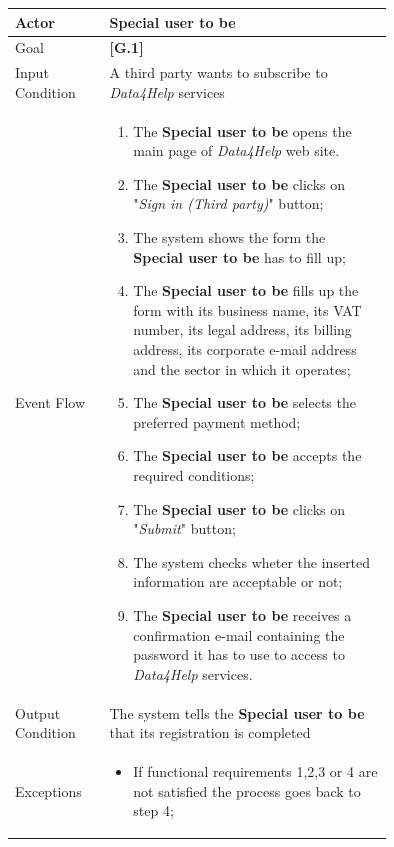\begin{center}
\begin{table}
\begin{tabular}{ | l | p{0.75\linewidth} | }
  \hline
    Actor & \textbf{Special user to be} \\ \hline
    Goal & \textbf{[G.1]} \\ \hline
    Input Condition & A third party wants to subscribe to \textit{Data4Help} services \\ \hline
    Event Flow & \begin{minipage}[t]{0.7\textwidth}
      \begin{enumerate}
        \item The \textbf{Special user to be} opens the main page of \textit{Data4Help} web site.
        \item The \textbf{Special user to be} clicks on "\textit{Sign in (Third party)}" button;
        \item The system shows the form the \textbf{Special user to be} has to fill up;
        \item The \textbf{Special user to be} fills up the form with its business name, its VAT number, its legal address, its billing address, its corporate e-mail address and the sector in which it operates;
        \item The \textbf{Special user to be} selects the preferred payment method;
        \item The \textbf{Special user to be} accepts the required conditions;
        \item The \textbf{Special user to be} clicks on "\textit{Submit}" button;
        \item The system checks wheter the inserted information are acceptable or not;
        \item The \textbf{Special user to be} receives a confirmation e-mail containing the password it has to use to access to \textit{Data4Help} services.
      \end{enumerate}
    \smallskip
  \end{minipage} \\ \hline
  Output Condition & The system tells the \textbf{Special user to be} that its registration is completed \\ \hline
  Exceptions & \begin{minipage}[t]{0.7\textwidth}
    \begin{itemize}
      \smallskip
      \item If functional requirements 1,2,3 or 4 are not satisfied the process goes back to step 4;

\end{itemize}
\end{minipage}
\end{tabular}
\end{table}
\end{center}
